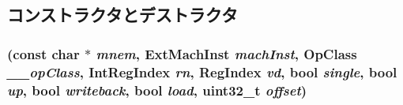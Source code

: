 \subsection{コンストラクタとデストラクタ}
\hypertarget{classArmISA_1_1MacroVFPMemOp_ac86efcec990c72ecd0ea1044552863f9}{
\subsubsection[{MacroVFPMemOp}]{ (const char $\ast$ {\em mnem}, \/  {\bf ExtMachInst} {\em machInst}, \/  OpClass {\em \_\-\_\-opClass}, \/  {\bf IntRegIndex} {\em rn}, \/  {\bf RegIndex} {\em vd}, \/  bool {\em single}, \/  bool {\em up}, \/  bool {\em writeback}, \/  bool {\em load}, \/  {\bf uint32\_\-t} {\em offset})}}
\label{classArmISA_1_1MacroVFPMemOp_ac86efcec990c72ecd0ea1044552863f9}



